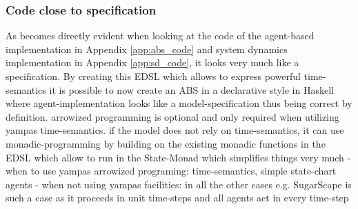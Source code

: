 \subsubsection{Code close to specification}
As becomes directly evident when looking at the code of the agent-based implementation in Appendix \ref{app:abs_code} and system dynamics implementation in Appendix \ref{app:sd_code}, it looks very much like a specification. By creating this EDSL which allows to express powerful time-semantics it is possible to now create an ABS in a declarative style in Haskell where agent-implementation looks like a model-specification thus being correct by definition.
arrowized programming is optional and only required when utilizing yampas time-semantics. if the model does not rely on time-semantics, it can use monadic-programming by building on the existing monadic functions in the EDSL which allow to run in the State-Monad which simplifies things very much
	- when to use yampas arrowized programing: time-semantics, simple state-chart agents 
	- when not using yampas facilities: in all the other cases e.g. SugarScape is such a case as it proceeds in unit time-steps and all agents act in every time-step
	
